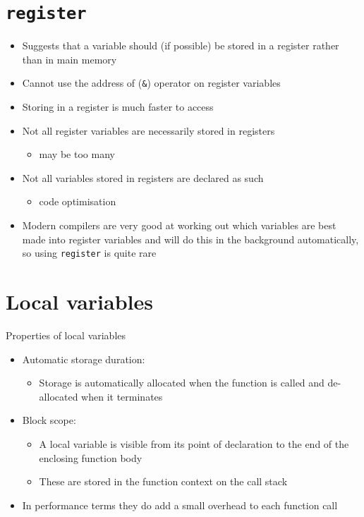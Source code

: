 \documentclass{article}
\begin{document}
\section{\texttt{register}}
\begin{itemize}
\item Suggests that a variable should (if possible) be stored in a register rather than in main memory
\item Cannot use the address of (\verb!&!) operator on register variables
\item Storing in a register is much faster to access
\item Not all register variables are necessarily stored in registers 
\begin{itemize}
\item may be too many
\end{itemize}
\item Not all variables stored in registers are declared as such 
\begin{itemize}
\item code optimisation
\end{itemize}
\item Modern compilers are very good at working out which variables are best made into register variables and will do this in the background automatically, so using \verb!register! is quite rare
\end{itemize}



\section{Local variables}
Properties of local variables
\begin{itemize}
\item Automatic storage duration:
\begin{itemize}
\item Storage is automatically allocated when the function is called and de-allocated when it terminates
\end{itemize}

\item Block scope:
\begin{itemize}
\item A local variable is visible from its point of declaration to the end of the enclosing function body
\item These are stored in the function context on the call stack
\end{itemize}
\item In performance terms they do add a small overhead to each function call
\end{itemize}
\end{document}
